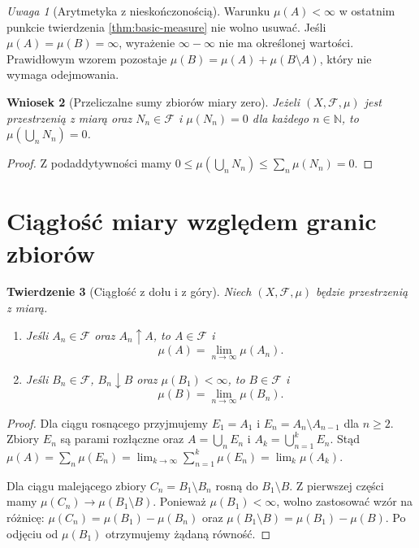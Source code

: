 \documentclass[11pt,a4paper,oneside]{book}
\numberwithin{equation}{chapter}
\theoremstyle{plain}
\newtheorem{twierdzenie}{Twierdzenie}[chapter]
\newtheorem{wniosek}[twierdzenie]{Wniosek}
\theoremstyle{definition}
\theoremstyle{remark}
\newtheorem{uwaga}[twierdzenie]{Uwaga}
\begin{document}
\begin{uwaga}[Arytmetyka z nieskończonością]
Warunku $\mu(A)<\infty$ w ostatnim punkcie twierdzenia
\ref{thm:basic-measure} nie wolno usuwać. Jeśli
$\mu(A)=\mu(B)=\infty$, wyrażenie $\infty-\infty$
nie ma określonej wartości. Prawidłowym wzorem pozostaje
$\mu(B)=\mu(A)+\mu(B\setminus A)$, który nie wymaga odejmowania.
\end{uwaga}

\begin{wniosek}[Przeliczalne sumy zbiorów miary zero]
\label{cor:null-union}
Jeżeli $(X,\mathcal F,\mu)$ jest przestrzenią z miarą oraz
$N_n\in\mathcal F$ i $\mu(N_n)=0$ dla każdego $n\in\mathbb N$,
to $\mu(\bigcup_nN_n)=0$.
\end{wniosek}
\begin{proof}
Z podaddytywności mamy
$0\leq\mu(\bigcup_nN_n)\leq\sum_n\mu(N_n)=0$.
\end{proof}

\section{Ciągłość miary względem granic zbiorów}

\begin{twierdzenie}[Ciągłość z dołu i z góry]
\label{thm:measure-continuity}
Niech $(X,\mathcal F,\mu)$ będzie przestrzenią z miarą.
\begin{enumerate}
\item Jeśli $A_n\in\mathcal F$ oraz $A_n\uparrow A$, to
$A\in\mathcal F$ i
\begin{equation}
\label{eq:continuity-below}
\mu(A)=\lim_{n\to\infty}\mu(A_n).
\end{equation}
\item Jeśli $B_n\in\mathcal F$, $B_n\downarrow B$ oraz
$\mu(B_1)<\infty$, to $B\in\mathcal F$ i
\begin{equation}
\label{eq:continuity-above}
\mu(B)=\lim_{n\to\infty}\mu(B_n).
\end{equation}
\end{enumerate}
\end{twierdzenie}
\begin{proof}
Dla ciągu rosnącego przyjmujemy $E_1=A_1$ i
$E_n=A_n\setminus A_{n-1}$ dla $n\geq2$.
Zbiory $E_n$ są parami rozłączne oraz
$A=\bigcup_nE_n$ i $A_k=\bigcup_{n=1}^kE_n$.
Stąd
$\mu(A)=\sum_n\mu(E_n)=\lim_{k\to\infty}\sum_{n=1}^k\mu(E_n)
=\lim_k\mu(A_k)$.

Dla ciągu malejącego zbiory $C_n=B_1\setminus B_n$ rosną
do $B_1\setminus B$. Z pierwszej części mamy
$\mu(C_n)\to\mu(B_1\setminus B)$. Ponieważ
$\mu(B_1)<\infty$, wolno zastosować wzór na różnicę:
$\mu(C_n)=\mu(B_1)-\mu(B_n)$ oraz
$\mu(B_1\setminus B)=\mu(B_1)-\mu(B)$.
Po odjęciu od $\mu(B_1)$ otrzymujemy żądaną równość.
\end{proof}
\end{document}
